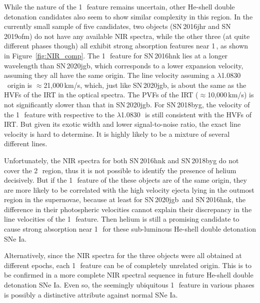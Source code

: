 \documentclass[twocolumn]{aastex631}
\newcommand\sn{SN\,2020jgb}
\begin{document}
While the nature of the 1\,\micron\ feature remains uncertain, other He-shell double detonation candidates also seem to show similar complexity in this region. In the currently small sample of five candidates, two objects (SN\,2016jhr and SN\,2019ofm) do not have any available NIR spectra, while the other three (at quite different phases though) all exhibit strong absorption features near 1\,\micron, as shown in Figure~\ref{fig:NIR_comp}. The 1\,\micron\ feature for SN\,2016hnk lies at a longer wavelength than \sn, which corresponds to a lower expansion velocity, assuming they all have the same origin. The line velocity assuming a  $\lambda$1.0830\,\micron\ origin is $\approx$21,000\,km/s, which, just like \sn, is about the same as the HVFs of the  IRT in the optical spectra. The PVFs of the  IRT ($\approx$10,000\,km/s) is not significantly slower than that in \sn. For SN\,2018byg, the velocity of the 1\,\micron\ feature with respective to the  $\lambda$1.0830\,\micron\ is still consistent with the HVFs of  IRT. But given its exotic width and lower signal-to-noise ratio, the exact line velocity is hard to determine. It is highly likely to be a mixture of several different lines. 

Unfortunately, the NIR spectra for both SN\,2016hnk and SN\,2018byg do not cover the 2\,\micron\ region, thus it is not possible to identify the presence of helium decisively. But if the 1\,\micron\ feature of the these objects are of the same origin, they are more likely to be correlated with the high velocity ejecta lying in the outmost region in the supernovae, because at least for \sn\ and SN\,2016hnk, the difference in their photospheric velocities cannot explain their discrepancy in the line velocities of the 1\,\micron\ feature. Then helium is still a promising candidate to cause strong absorption near 1\,\micron\ for these sub-luminous He-shell double detonation SNe Ia. 

Alternatively, since the NIR spectra for the three objects were all obtained at different epochs, each 1\,\micron\ feature can be of completely unrelated origin. This is to be confirmed in a more complete NIR spectral sequence in future He-shell double detonation SNe Ia. Even so, the seemingly ubiquitous 1\,\micron\ feature in various phases is possibly a distinctive attribute against normal SNe Ia.
\end{document}
